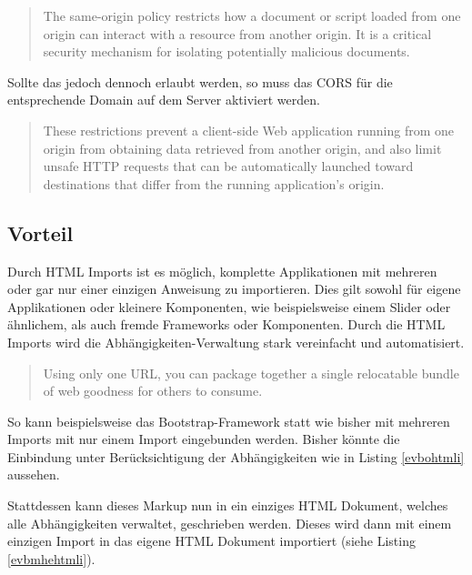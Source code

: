 \begin{quote}
The same-origin policy restricts how a document or script loaded from one origin can interact with a resource from another origin. It is a critical security mechanism for isolating potentially malicious documents. \cite{citeulike:13853253}
\end{quote}

Sollte das jedoch dennoch erlaubt werden, so muss das \ac{CORS} für die entsprechende Domain auf dem Server aktiviert werden.

\begin{quote}
These restrictions prevent a client-side Web application running from one origin from obtaining data retrieved from another origin, and also limit unsafe \ac{HTTP} requests that can be automatically launched toward destinations that differ from the running application's origin. \cite{citeulike:13853643}
\end{quote}


\subsection{Vorteil}\label{vorteil}

Durch \ac{HTML} Imports ist es möglich, komplette Applikationen mit mehreren oder gar nur einer einzigen Anweisung zu importieren. Dies gilt sowohl für eigene Applikationen oder kleinere Komponenten, wie beispielsweise einem Slider oder ähnlichem, als auch fremde Frameworks oder Komponenten. Durch die \ac{HTML} Imports wird die Abhängigkeiten-Verwaltung stark vereinfacht und automatisiert.

\begin{quote}
Using only one URL, you can package together a single relocatable bundle of web goodness for others to consume. \cite{citeulike:13853647}
\end{quote}

So kann beispielsweise das Bootstrap-Framework statt wie bisher mit mehreren Imports mit nur einem Import eingebunden werden. Bisher könnte die Einbindung unter Berücksichtigung der Abhängigkeiten wie in Listing \ref{evbohtmli} aussehen.



Stattdessen kann dieses Markup nun in ein einziges \ac{HTML} Dokument, welches alle Abhängigkeiten verwaltet, geschrieben werden. Dieses wird dann mit einem einzigen Import in das eigene \ac{HTML} Dokument importiert (siehe Listing \ref{evbmhehtmli}).

